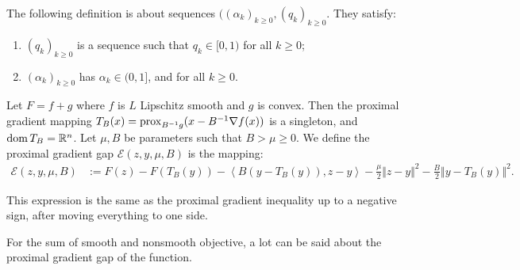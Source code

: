 \documentclass[12pt]{article}
\begin{document}
    \begin{definition}\label{def:rlx-momentum-seq}
        The following definition is about sequences $((\alpha_k)_{k \ge 0}, (q_k)_{k \ge 0}$. 
        They satisfy:
        \begin{enumerate}[nosep]
            \item $(q_k)_{k \ge 0}$ is a sequence such that $q_k \in [0, 1)$ for all $k \ge 0$;
            \item $(\alpha_k)_{k \ge 0}$ has $\alpha_k \in (0, 1]$, and for all $k \ge 0$. 
        \end{enumerate}
    \end{definition}
    \begin{definition}\label{def:pg-gap}
        Let $F = f + g$ where $f$ is $L$ Lipschitz smooth and $g$ is convex. 
        Then the proximal gradient mapping $T_B(x) = \operatorname{prox}_{B^{-1}g}(x -  B^{-1}\nabla f(x))$ is a singleton, and $\operatorname{dom} T_B = \mathbb R^n$. 
        Let $\mu, B$ be parameters such that $B > \mu \ge 0$. 
        We define the proximal gradient gap $\mathcal E(z, y, \mu, B)$ is the mapping: 
        \begin{align*}
            \mathcal E(z, y, \mu, B) &:= 
            F(z) - F(T_B(y)) 
            - \left\langle B(y - T_B(y)), z - y\right\rangle
            - \frac{\mu}{2}\Vert z - y\Vert^2
            - \frac{B}{2}\Vert y - T_B(y)\Vert^2. 
        \end{align*}
    \end{definition}
    \begin{remark}
        This expression is the same as the proximal gradient inequality up to a negative sign, after moving everything to one side. 
    \end{remark}
    For the sum of smooth and nonsmooth objective, a lot can be said about the proximal gradient gap of the function. 
    \begin{lemma}\label{lemma:pg-under-cnvx}

    \end{lemma}
    
\end{document}
